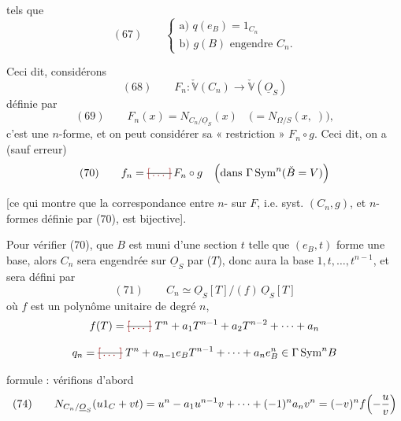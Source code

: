 \documentclass[11pt,a4paper]{article}
\begin{document}

tels que
\[
(67)\qquad
\begin{cases}
\text{a) } q(e_B) = 1_{C_n} \\
\text{b) } g(B) \text{ engendre } C_n .
\end{cases}
\]

Ceci dit, considérons  
\[
(68)\qquad F_n : \check{\mathbb{V}}(C_n) \longrightarrow \check{\mathbb{V}}(\underline{O}_S)
\]
définie par
\[
(69)\qquad F_n(x) = N_{C_n/\underline{O}_S}(x) \quad \bigl(= N_{\Omega/S}(x, \;)\bigr),
\]
c'est une $n$-forme, et on peut considérer sa « restriction » $F_n \circ g$.
Ceci dit, on a (sauf erreur)
\[
(70)\qquad f_n = \text{\struck{\ill{}}}\, F_n \circ g
\quad \Bigl(\text{dans } \Gamma\, \mathrm{Sym}^n(\check{B} = V)\Bigr)
\]

[ce qui montre que la correspondance entre $n$- sur $F$,
i.e. syst. $(C_n, g)$, et $n$-formes définie par (70), est bijective].

Pour vérifier (70),  que $B$ est muni d'une section $t$ telle
que $(e_B, t)$ forme une base, alors $C_n$ sera engendrée sur
$\underline{O}_S$ par  ($T$), donc aura la base
$1, t, \ldots, t^{n-1}$, et sera défini par
\[
(71)\qquad C_n \simeq \underline{O}_S[T] / (f)\, \underline{O}_S[T]
\]
où $f$ est un polynôme unitaire  de degré $n$,
\[
f(T) = \text{\struck{\ill{}}}\; T^n + a_1 T^{n-1} + a_2 T^{n-2} + \cdots + a_n
\]

\[
q_n = \text{\struck{\ill{}}}\; T^n + a_{n-1} e_B T^{n-1} + \cdots + a_n e_B^n
\in \Gamma\, \mathrm{Sym}^n B
\]

 \ill{}  formule : vérifions d'abord
\[
(74)\qquad N_{C_n/\underline{O}_S}(u 1_C + v t)
= u^n - a_1 u^{n-1} v + \cdots + (-1)^n a_n v^n
= (-v)^n f\Bigl(-\frac{u}{v}\Bigr)
\]
\end{document}
